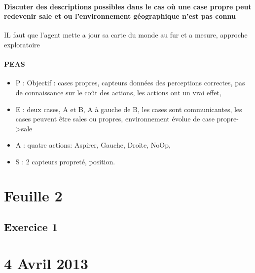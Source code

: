 \documentclass{article}
\begin{document}
\paragraph{Discuter des descriptions possibles dans le cas où une case propre peut redevenir sale et ou l'environnement géographique n'est pas connu} IL faut que l'agent mette a jour sa carte du monde au fur et a mesure, approche exploratoire
\paragraph{PEAS}
\begin{itemize}
\item P : Objectif : cases propres, capteurs données des perceptions correctes, pas de connaissance sur le coût des actions, les actions ont un vrai effet, 
\item E : deux cases, A et B, A à gauche de B, les cases sont communicantes, les cases peuvent être sales ou propres, environnement évolue de case propre->sale
\item A : quatre actions: Aspirer, Gauche, Droite, NoOp,
\item S : 2 capteurs propreté, position.
\end{itemize}

\section{Feuille 2}
\subsection{Exercice 1}


\section{4 Avril 2013}
\end{document}

